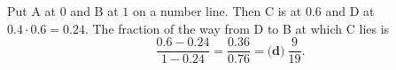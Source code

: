 Put A at $0$ and B at $1$ on a number line. Then C is at $0.6$ and D at $0.4\cdot0.6=0.24$. The fraction of the way from D to B at which C lies is
\[
\dfrac{0.6-0.24}{1-0.24}=\dfrac{0.36}{0.76}=\boxed{\textbf{(d)}\ \dfrac{9}{19}} .
\]
